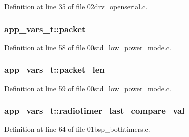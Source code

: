 Definition at line 35 of file 02drv\+\_\+openserial.\+c.

\subsubsection[{\texorpdfstring{packet}{packet}}]{ app\+\_\+vars\+\_\+t\+::packet}\hypertarget{structapp__vars__t_a4f3dd89ed254d75dd826b5a46e061fd2}{}\label{structapp__vars__t_a4f3dd89ed254d75dd826b5a46e061fd2}


Definition at line 58 of file 00std\+\_\+low\+\_\+power\+\_\+mode.\+c.

\subsubsection[{\texorpdfstring{packet\+\_\+len}{packet_len}}]{ app\+\_\+vars\+\_\+t\+::packet\+\_\+len}\hypertarget{structapp__vars__t_adc518008afbfd51f0719c4b17c7ae5d7}{}\label{structapp__vars__t_adc518008afbfd51f0719c4b17c7ae5d7}


Definition at line 59 of file 00std\+\_\+low\+\_\+power\+\_\+mode.\+c.

\subsubsection[{\texorpdfstring{radiotimer\+\_\+last\+\_\+compare\+\_\+val}{radiotimer_last_compare_val}}]{ app\+\_\+vars\+\_\+t\+::radiotimer\+\_\+last\+\_\+compare\+\_\+val}\hypertarget{structapp__vars__t_ae71aed926934fca39541078d444d56b9}{}\label{structapp__vars__t_ae71aed926934fca39541078d444d56b9}


Definition at line 64 of file 01bsp\+\_\+bothtimers.\+c.

